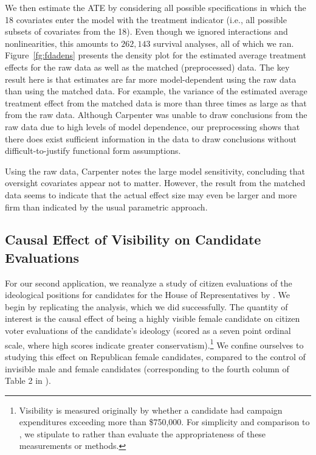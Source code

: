 \documentclass[11pt,titlepage]{article}
\begin{document}
We then estimate the ATE by considering all possible specifications in
which the 18 covariates enter the model with the treatment indicator
(i.e., all possible subsets of covariates from the 18).  Even though
we ignored interactions and nonlinearities, this amounts to $262,143$
survival analyses, all of which we ran. Figure~\ref{fg:fdadens}
presents the density plot for the estimated average treatment effects
for the raw data as well as the matched (preprocessed) data.  The key
result here is that estimates are far more model-dependent using the
raw data than using the matched data.  For example, the variance of
the estimated average treatment effect from the matched data is more
than three times as large as that from the raw data.  Although
Carpenter was unable to draw conclusions from the raw data due to
high levels of model dependence, our preprocessing shows that there
does exist sufficient information in the data to draw conclusions
without difficult-to-justify functional form assumptions.

Using the raw data, Carpenter notes the large model sensitivity,
concluding that oversight covariates appear not to matter.  However,
the result from the matched data seems to indicate that the actual
effect size may even be larger and more firm than indicated by the
usual parametric approach.

\subsection{Causal Effect of Visibility on Candidate
  Evaluations}

For our second application, we reanalyze a study of citizen
evaluations of the ideological positions for candidates for the House
of Representatives by \citet{Koch02}.  We begin by replicating the
analysis, which we did successfully.  The quantity of interest is the
causal effect of being a highly visible female candidate on citizen
voter evaluations of the candidate's ideology (scored as a seven point
ordinal scale, where high scores indicate greater
conservatism).\footnote{Visibility is measured originally by whether a
  candidate had campaign expenditures exceeding more than \$750,000.
  For simplicity and comparison to \citet{Koch02}, we stipulate to
  rather than evaluate the appropriateness of these measurements or
  methods.}  We confine ourselves to studying this effect on
Republican female candidates, compared to the control of invisible
male and female candidates (corresponding to the fourth column of
Table 2 in \citet[p.  459]{Koch02}).
\end{document}
